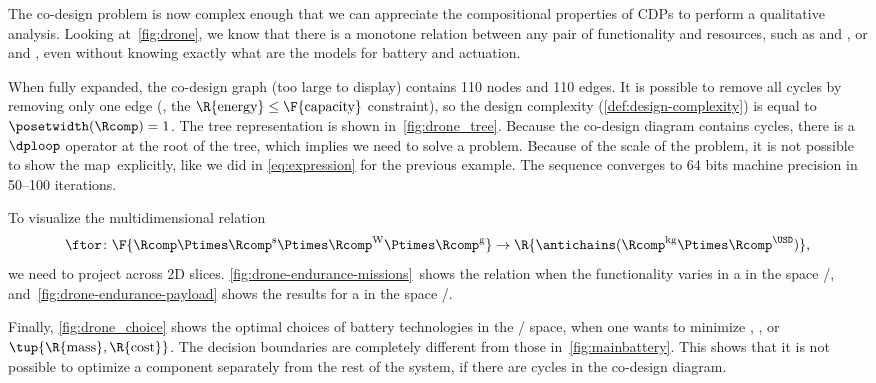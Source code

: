 The co-design problem is now complex enough that we can appreciate
the compositional properties of CDPs to perform a qualitative analysis.
Looking at~\cref{fig:drone}, we know that there is a monotone relation
between any pair of functionality and resources, such as 
and , or  and , even without knowing
exactly what are the models for battery and actuation.

When fully expanded, the co-design graph (too large to display) contains
110 nodes and 110 edges.
It is possible to remove all cycles by removing
only one edge (\eg, the $\R{\text{energy}}\leq\text{\F{\text{capacity}}}$
constraint), so the design complexity (\cref{def:design-complexity})
is equal to~$\posetwidth(\Rcomp)=1$.
The
tree representation is shown in~\cref{fig:drone_tree}.
Because the co-design diagram contains cycles, there is a~$\dploop$ operator at the root of the tree, which implies we need to solve a  problem.
Because of the scale of the problem, it is not possible to show the map~\ftor explicitly, like we did in \cref{eq:expression} for the previous example.
The  sequence converges to 64 bits machine precision in 50--100 iterations.

To visualize the multidimensional relation
\begin{equation}
    \ftor\colon\F{\Rcomp\Ptimes\Rcomp^{\text{s}}\Ptimes\Rcomp^{\text{W}}\Ptimes\Rcomp^{\text{g}}}\rightarrow\R{\antichains(\Rcomp^{\text{kg}}\Ptimes\Rcomp^{\USD})},
\end{equation}
we need to project across 2D slices.
\cref{fig:drone-endurance-missions}~shows
the relation when the functionality varies in a  in the space
/, and~\cref{fig:drone-endurance-payload}
shows the results for a  in the space /.

Finally, \cref{fig:drone_choice} shows the optimal choices of battery technologies in the / space, when one wants to minimize , , or~$\tup{ \R{\text{mass}},\R{\text{cost}}} $.
The decision boundaries are completely different from those in~\cref{fig:mainbattery}.
This shows that it is not possible to optimize a component separately from the rest of the system, if there are cycles in the co-design diagram.

